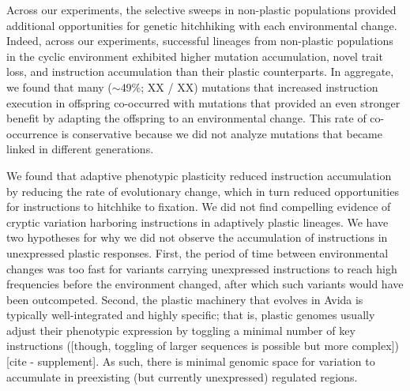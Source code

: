 Across our experiments, the selective sweeps in non-plastic populations provided additional opportunities for genetic hitchhiking with each environmental change. 
Indeed, across our experiments, successful lineages from non-plastic populations in the cyclic environment exhibited higher mutation accumulation, novel trait loss, and  instruction accumulation than their plastic counterparts.
In aggregate, we found that many ($\sim$49\%; XX / XX) mutations that increased  instruction execution in offspring co-occurred with mutations that provided an even stronger benefit by adapting the offspring to an environmental change.
This rate of co-occurrence is conservative because we did not analyze mutations that became linked in different generations.


We found that adaptive phenotypic plasticity reduced  instruction accumulation by reducing the rate of evolutionary change, which in turn reduced opportunities for  instructions to hitchhike to fixation.
We did not find compelling evidence of cryptic variation harboring  instructions in adaptively plastic lineages.
We have two hypotheses for why we did not observe the accumulation of  instructions in unexpressed plastic responses.
First, the period of time between environmental changes was too fast for variants carrying unexpressed  instructions to reach high frequencies before the environment changed, after which such variants would have been outcompeted.
Second, the plastic machinery that evolves in Avida is typically well-integrated and highly specific; that is, plastic genomes usually adjust their phenotypic expression by toggling a minimal number of key instructions ([though, toggling of larger sequences is possible but more complex]) [cite - supplement].
As such, there is minimal genomic space for variation to accumulate in preexisting (but currently unexpressed) regulated regions.


